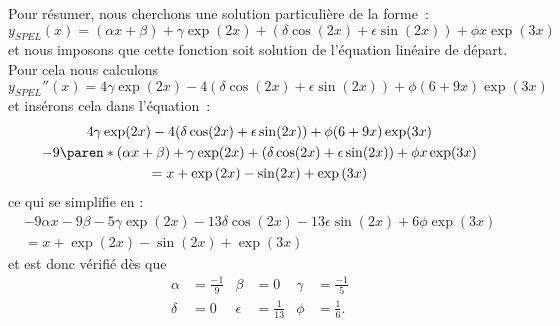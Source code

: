 \begin{frame}
  Pour résumer, nous cherchons une solution particulière de la forme~:\pause{}
  \begin{equation*}
    y_{SPEL}(x) = (\alpha x + \beta) + \gamma \exp(2x) + (\delta \cos(2x) + \epsilon \sin(2x)) + \phi x \exp(3x)
  \end{equation*}\pause
  et nous imposons que cette fonction soit solution de l'équation linéaire de départ.\pause{} Pour cela nous calculons
  \begin{equation*}
    y_{SPEL}''(x) = 4 \gamma \exp(2x) - 4 (\delta \cos(2x) + \epsilon \sin(2x)) + \phi (6 + 9 x) \exp(3x)
  \end{equation*}\pause
  et insérons cela dans l'équation~:\pause{}
  \begin{multline*}
    4 \gamma \exp(2x) -  4 (\delta \cos(2x) + \epsilon \sin(2x)) + \phi (6 + 9 x) \exp(3x)\\ - 9\paren*{(\alpha x + \beta) + \gamma \exp(2x) + (\delta \cos(2x) + \epsilon \sin(2x)) + \phi x \exp(3x)} \\
    = x + \exp{(2x)} - \sin(2x) + \exp{(3x)}
  \end{multline*}\pause
  ce qui se simplifie en :\pause{}
  \begin{multline*}
    - 9 \alpha x - 9 \beta - 5 \gamma \exp(2x) - 13 \delta \cos(2x) - 13 \epsilon \sin(2x) + 6 \phi \exp(3x)\\ = x + \exp{(2x)} - \sin(2x) + \exp{(3x)}
  \end{multline*}\pause
  et est donc vérifié dès que\pause{}
  \begin{align*}
    \alpha   &= \frac{-1}{9} & \beta    &= 0            & \gamma   &= \frac{-1}{5} \\
    \delta &= 0 & \epsilon &= \frac{1}{13} & \phi &= \frac{1}{6}.
  \end{align*}
\end{frame}
